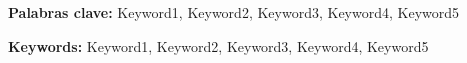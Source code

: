\vspace*{\fill}
\begin{abstract}
	\lipsum[1-1]
\end{abstract}
\textbf{Palabras clave:} Keyword1, Keyword2, Keyword3, Keyword4, Keyword5

\vfill


\begin{abstract}
	\lipsum[1-1]
\end{abstract}

\textbf{Keywords:} Keyword1, Keyword2, Keyword3, Keyword4, Keyword5
\vspace*{\fill}